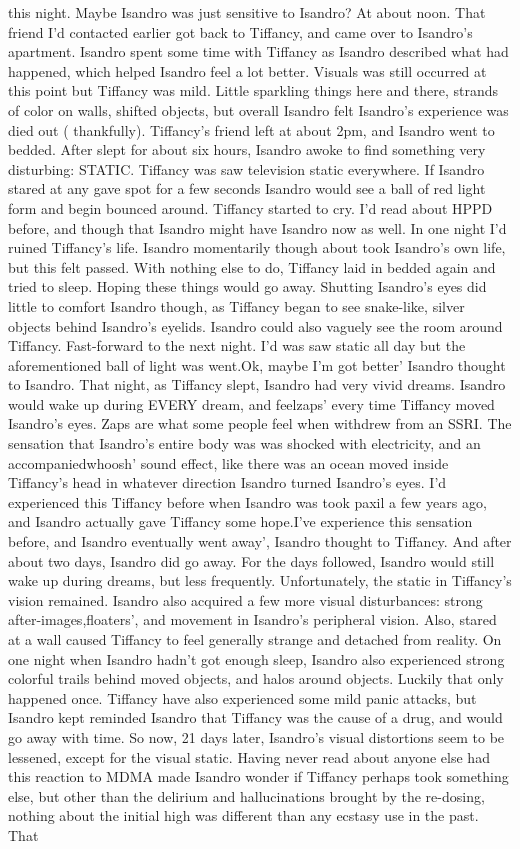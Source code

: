 \documentclass[12pt]{book}
\begin{document}
this night. Maybe Isandro was just sensitive to Isandro? At about noon. That friend I'd contacted earlier got back to Tiffancy, and came over to Isandro's apartment. Isandro spent some time with Tiffancy as Isandro described what had happened, which helped Isandro feel a lot better. Visuals was still occurred at this point but Tiffancy was mild. Little sparkling things here and there, strands of color on walls, shifted objects, but overall Isandro felt Isandro's experience was died out ( thankfully). Tiffancy's friend left at about 2pm, and Isandro went to bedded. After slept for about six hours, Isandro awoke to find something very disturbing: STATIC. Tiffancy was saw television static everywhere. If Isandro stared at any gave spot for a few seconds Isandro would see a ball of red light form and begin bounced around. Tiffancy started to cry. I'd read about HPPD before, and though that Isandro might have Isandro now as well. In one night I'd ruined Tiffancy's life. Isandro momentarily though about took Isandro's own life, but this felt passed. With nothing else to do, Tiffancy laid in bedded again and tried to sleep. Hoping these things would go away. Shutting Isandro's eyes did little to comfort Isandro though, as Tiffancy began to see snake-like, silver objects behind Isandro's eyelids. Isandro could also vaguely see the room around Tiffancy. Fast-forward to the next night. I'd was saw static all day but the aforementioned ball of light was went.Ok, maybe I'm got better' Isandro thought to Isandro. That night, as Tiffancy slept, Isandro had very vivid dreams. Isandro would wake up during EVERY dream, and feelzaps' every time Tiffancy moved Isandro's eyes. Zaps are what some people feel when withdrew from an SSRI. The sensation that Isandro's entire body was was shocked with electricity, and an accompaniedwhoosh' sound effect, like there was an ocean moved inside Tiffancy's head in whatever direction Isandro turned Isandro's eyes. I'd experienced this Tiffancy before when Isandro was took paxil a few years ago, and Isandro actually gave Tiffancy some hope.I've experience this sensation before, and Isandro eventually went away', Isandro thought to Tiffancy. And after about two days, Isandro did go away. For the days followed, Isandro would still wake up during dreams, but less frequently. Unfortunately, the static in Tiffancy's vision remained. Isandro also acquired a few more visual disturbances: strong after-images,floaters', and movement in Isandro's peripheral vision. Also, stared at a wall caused Tiffancy to feel generally strange and detached from reality. On one night when Isandro hadn't got enough sleep, Isandro also experienced strong colorful trails behind moved objects, and halos around objects. Luckily that only happened once. Tiffancy have also experienced some mild panic attacks, but Isandro kept reminded Isandro that Tiffancy was the cause of a drug, and would go away with time. So now, 21 days later, Isandro's visual distortions seem to be lessened, except for the visual static. Having never read about anyone else had this reaction to MDMA made Isandro wonder if Tiffancy perhaps took something else, but other than the delirium and hallucinations brought by the re-dosing, nothing about the initial high was different than any ecstasy use in the past. That 
\end{document}
